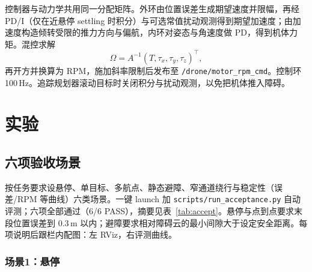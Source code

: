 控制器与动力学共用同一分配矩阵。外环由位置误差生成期望速度并限幅，再经 PD/I（仅在近悬停 settling 时积分）与可选常值扰动观测得到期望加速度；由加速度构造倾转受限的推力方向与偏航，内环对姿态与角速度做 PD，得到机体力矩。混控求解
\begin{equation}
  \Omega = A^{-1}(T,\tau_x,\tau_y,\tau_z)^\top,
\end{equation}
再开方并换算为 RPM，施加斜率限制后发布至 \texttt{/drone/motor\_rpm\_cmd}。控制环 100\,Hz。追踪规划器滚动目标时关闭积分与扰动观测，以免把机体推入障碍。

\chapter{实验}

\section{六项验收场景}

按任务要求设悬停、单目标、多航点、静态避障、窄通道绕行与稳定性（误差/RPM 等曲线）六类场景。一键 launch 加 \texttt{scripts/run\_acceptance.py} 自动评测；六项全部通过（6/6 PASS），摘要见表~\ref{tab:accept}。悬停与点到点要求末段位置误差到 $0.3\,\mathrm{m}$ 以内；避障要求相对障碍云的最小间隙大于设定安全距离。每项说明后跟栏内配图：左 RViz，右评测曲线。


\subsection{场景1：悬停}

